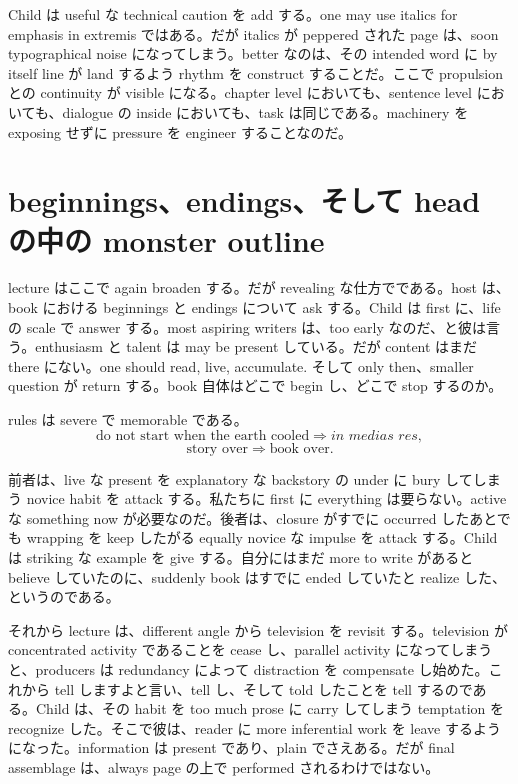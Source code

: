 Child は useful な technical caution を add する。one may use italics for emphasis in extremis ではある。だが italics が peppered された page は、soon typographical noise になってしまう。better なのは、その intended word に by itself line が land するよう rhythm を construct することだ。ここで propulsion との continuity が visible になる。chapter level においても、sentence level においても、dialogue の inside においても、task は同じである。machinery を exposing せずに pressure を engineer することなのだ。

\section{beginnings、endings、そして head の中の monster outline}

lecture はここで again broaden する。だが revealing な仕方でである。host は、book における beginnings と endings について ask する。Child は first に、life の scale で answer する。most aspiring writers は、too early なのだ、と彼は言う。enthusiasm と talent は may be present している。だが content はまだ there にない。one should read, live, accumulate. そして only then、smaller question が return する。book 自体はどこで begin し、どこで stop するのか。

rules は severe で memorable である。
\begin{equation}
\text{do not start when the earth cooled} \Longrightarrow \textit{in medias res},
\end{equation}
\begin{equation}
\text{story over} \Longrightarrow \text{book over}.
\end{equation}

前者は、live な present を explanatory な backstory の under に bury してしまう novice habit を attack する。私たちに first に everything は要らない。active な something now が必要なのだ。後者は、closure がすでに occurred したあとでも wrapping を keep したがる equally novice な impulse を attack する。Child は striking な example を give する。自分にはまだ more to write があると believe していたのに、suddenly book はすでに ended していたと realize した、というのである。

それから lecture は、different angle から television を revisit する。television が concentrated activity であることを cease し、parallel activity になってしまうと、producers は redundancy によって distraction を compensate し始めた。これから tell しますよと言い、tell し、そして told したことを tell するのである。Child は、その habit を too much prose に carry してしまう temptation を recognize した。そこで彼は、reader に more inferential work を leave するようになった。information は present であり、plain でさえある。だが final assemblage は、always page の上で performed されるわけではない。

